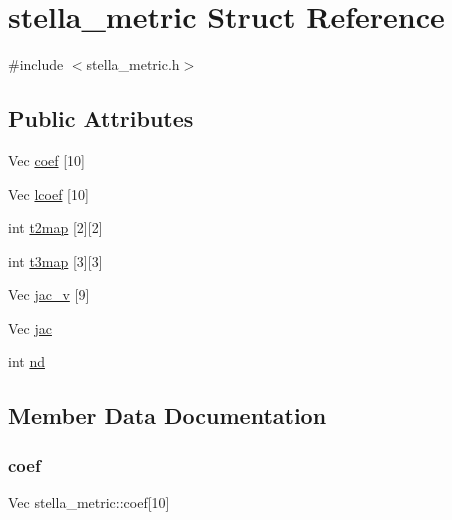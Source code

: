 \hypertarget{structstella__metric}{}\section{stella\+\_\+metric Struct Reference}
\label{structstella__metric}


{\ttfamily \#include $<$stella\+\_\+metric.\+h$>$}

\subsection*{Public Attributes}
\begin{DoxyCompactItemize}
\item 
Vec \mbox{\hyperlink{structstella__metric_a2d63b6aa055029c1b6efac66503fbf8a}{coef}} \mbox{[}10\mbox{]}
\item 
Vec \mbox{\hyperlink{structstella__metric_a582b1759d82add2b966c5aa392efc9d6}{lcoef}} \mbox{[}10\mbox{]}
\item 
int \mbox{\hyperlink{structstella__metric_ad1daf5b7f91864a76edb121e61d8a4c1}{t2map}} \mbox{[}2\mbox{]}\mbox{[}2\mbox{]}
\item 
int \mbox{\hyperlink{structstella__metric_ae94574eec95ae62749a189dc8badd663}{t3map}} \mbox{[}3\mbox{]}\mbox{[}3\mbox{]}
\item 
Vec \mbox{\hyperlink{structstella__metric_a103aeacf60443909fc7e0c8ce59a6832}{jac\+\_\+v}} \mbox{[}9\mbox{]}
\item 
Vec \mbox{\hyperlink{structstella__metric_a8634171cd81017020e85ee193658cf61}{jac}}
\item 
int \mbox{\hyperlink{structstella__metric_a49cb80511360aab0d2737e11c2e31263}{nd}}
\end{DoxyCompactItemize}


\subsection{Member Data Documentation}
\mbox{\label{structstella__metric_a2d63b6aa055029c1b6efac66503fbf8a}} 
\subsubsection{\texorpdfstring{coef}{coef}}
{\footnotesize\ttfamily Vec stella\+\_\+metric\+::coef\mbox{[}10\mbox{]}}

